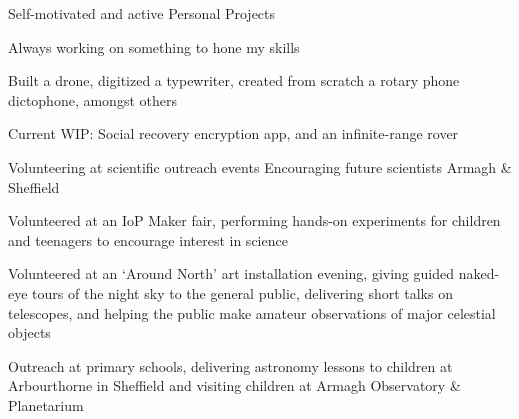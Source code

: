 \begin{cventries}

    \cventry 
      {Self-motivated and active}
      {Personal Projects}
      {}
      {}
      {
      \begin{cvitems}
          \item {Always working on something to hone my skills}
          \item {Built a drone, digitized a typewriter, created from scratch a rotary phone dictophone, amongst others}
          \item {Current WIP: Social recovery encryption app, and an infinite-range rover}
      \end{cvitems}
      }



  \cventry
    {Volunteering at scientific outreach events}
    {Encouraging future scientists}
    {Armagh \& Sheffield}
    {}
    {
    \begin{cvitems}
      \item {Volunteered at an IoP Maker fair, performing hands-on experiments for children and teenagers to encourage interest in science}
      \item {Volunteered at an `Around North' art installation evening, giving guided naked-eye tours of the night sky to the general public, delivering short talks on telescopes, and helping the public make amateur observations of major celestial objects}
      \item {Outreach at primary schools, delivering astronomy lessons to children at Arbourthorne in Sheffield and visiting children at Armagh Observatory \& Planetarium}
    \end{cvitems}
    }
    

\end{cventries}
